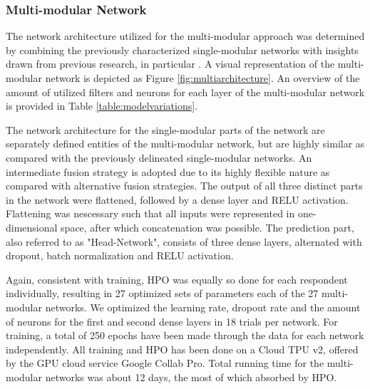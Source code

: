 \documentclass[12pt]{article}
\begin{document}
\subsubsection{Multi-modular Network}
The network architecture utilized for the multi-modular approach was determined by combining the previously characterized single-modular networks with insights drawn from previous research, in particular \cite{han2020classification}. A visual representation of the multi-modular network is depicted as Figure \ref{fig:multiarchitecture}. An overview of the amount of utilized filters and neurons for each layer of the multi-modular network is provided in Table \ref{table:modelvariations}.

The network architecture for the single-modular parts of the network are separately defined entities of the multi-modular network, but are highly similar as compared with the previously delineated single-modular networks. An intermediate fusion strategy is adopted due to its highly flexible nature as compared with alternative fusion strategies. The output of all three distinct parts in the network were flattened, followed by a dense layer and RELU activation.  Flattening was nescessary such that all inputs were represented in one-dimensional space, after which concatenation was possible. The prediction part, also referred to as "Head-Network", consists of three dense layers, alternated with dropout, batch normalization and RELU activation.  

Again, consistent with training, HPO was equally so done for each respondent individually, resulting in 27 optimized sets of parameters each of the 27 multi-modular networks. We optimized the learning rate, dropout rate and the amount of neurons for the first and second dense layers in 18 trials per network.  For training, a total of 250 epochs have been made through the data for each network independently. All training and HPO has been done on a Cloud TPU v2,  offered by the GPU cloud service Google Collab Pro.  Total running time for the multi-modular networks was about 12 days, the most of which absorbed by HPO. 
\end{document}
